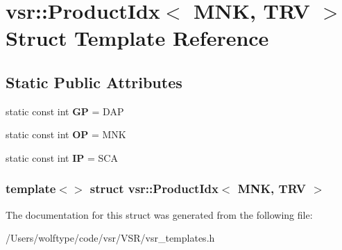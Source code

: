 \hypertarget{structvsr_1_1_product_idx_3_01_m_n_k_00_01_t_r_v_01_4}{\section{vsr\-:\-:Product\-Idx$<$ M\-N\-K, T\-R\-V $>$ Struct Template Reference}
\label{structvsr_1_1_product_idx_3_01_m_n_k_00_01_t_r_v_01_4}
}
\subsection*{Static Public Attributes}
\begin{DoxyCompactItemize}
\item 
\hypertarget{structvsr_1_1_product_idx_3_01_m_n_k_00_01_t_r_v_01_4_a83c6187875466f14be4033e2df7b3d04}{static const int {\bfseries G\-P} = D\-A\-P}\label{structvsr_1_1_product_idx_3_01_m_n_k_00_01_t_r_v_01_4_a83c6187875466f14be4033e2df7b3d04}

\item 
\hypertarget{structvsr_1_1_product_idx_3_01_m_n_k_00_01_t_r_v_01_4_a119c599f3cfe97f8552c42d096c32073}{static const int {\bfseries O\-P} = M\-N\-K}\label{structvsr_1_1_product_idx_3_01_m_n_k_00_01_t_r_v_01_4_a119c599f3cfe97f8552c42d096c32073}

\item 
\hypertarget{structvsr_1_1_product_idx_3_01_m_n_k_00_01_t_r_v_01_4_ab1c77da72e468968cbc98023ba9ac04b}{static const int {\bfseries I\-P} = S\-C\-A}\label{structvsr_1_1_product_idx_3_01_m_n_k_00_01_t_r_v_01_4_ab1c77da72e468968cbc98023ba9ac04b}

\end{DoxyCompactItemize}
\subsubsection*{template$<$$>$ struct vsr\-::\-Product\-Idx$<$ M\-N\-K, T\-R\-V $>$}



The documentation for this struct was generated from the following file\-:\begin{DoxyCompactItemize}
\item 
/\-Users/wolftype/code/vsr/\-V\-S\-R/vsr\-\_\-templates.\-h\end{DoxyCompactItemize}
